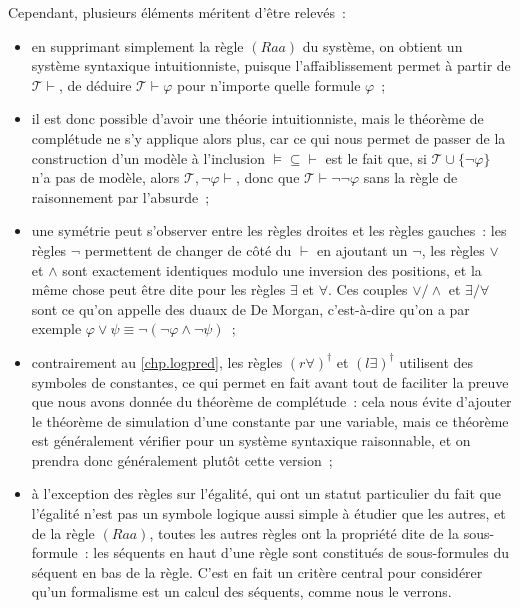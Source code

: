 Cependant, plusieurs éléments méritent d'être relevés~:
\begin{itemize}
\item en supprimant simplement la règle $(Raa)$ du système, on obtient un
  système syntaxique intuitionniste, puisque l'affaiblissement permet à partir
  de $\mathcal T \vdash$, de déduire $\mathcal T \vdash \varphi$ pour n'importe
  quelle formule $\varphi$~;
\item il est donc possible d'avoir une théorie intuitionniste, mais le théorème
  de complétude ne s'y applique alors plus, car ce qui nous permet de passer de
  la construction d'un modèle à l'inclusion $\vDash\subseteq\vdash$ est le fait
  que, si $\mathcal T \cup\{\lnot\varphi\}$ n'a pas de modèle, alors
  $\mathcal T, \lnot\varphi\vdash$, donc que
  $\mathcal T \vdash \lnot\lnot\varphi$ sans la règle de raisonnement par
  l'absurde~;
\item une symétrie peut s'observer entre les règles droites et les règles
  gauches~: les règles $\lnot$ permettent de changer de côté du $\vdash$ en
  ajoutant un $\lnot$, les règles $\lor$ et $\land$ sont exactement identiques
  modulo une inversion des positions, et la même chose peut être dite pour les
  règles $\exists$ et $\forall$. Ces couples $\lor/\land$ et $\exists/\forall$
  sont ce qu'on appelle des duaux de De Morgan, c'est-à-dire qu'on a par exemple
  $\varphi \lor \psi \equiv \lnot (\lnot \varphi \land \lnot \psi)$~;
\item contrairement au \cref{chp.logpred}, les règles $(r\forall)^\dagger$ et
  $(l\exists)^\dagger$ utilisent des symboles de constantes, ce qui permet en
  fait avant tout de faciliter la preuve que nous avons donnée du théorème de
  complétude~: cela nous évite d'ajouter le théorème de simulation d'une
  constante par une variable, mais ce théorème est généralement vérifier pour
  un système syntaxique raisonnable, et on prendra donc généralement plutôt
  cette version~;
\item à l'exception des règles sur l'égalité, qui ont un statut particulier du
  fait que l'égalité n'est pas un symbole logique aussi simple à étudier que les
  autres, et de la règle $(Raa)$, toutes les autres règles ont la propriété dite
  de la sous-formule~: les séquents en haut d'une règle sont constitués de
  sous-formules du séquent en bas de la règle. C'est en fait un critère central
  pour considérer qu'un formalisme est un calcul des séquents, comme nous le
  verrons.
\end{itemize}

